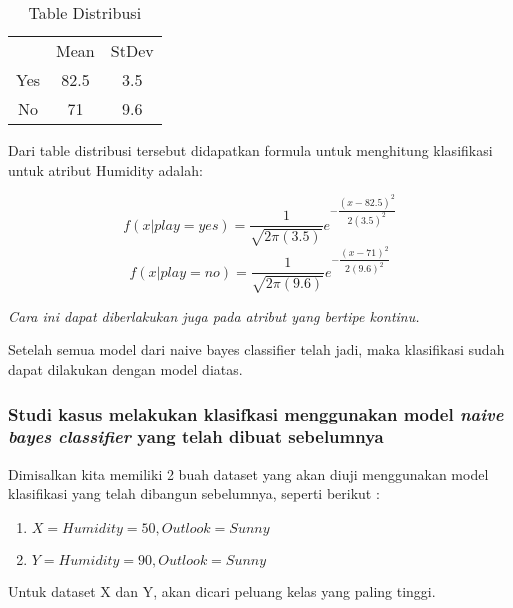 		\begin{table}[ht]
		\centering
		\caption{Table Distribusi}
		\begin{tabular}{|c|c|c|}
		\toprule
		 & Mean & StDev \\
		Yes & 82.5 & 3.5 \\
		No & 71 & 9.6 \\
		\bottomrule
		\end{tabular}
		\end{table}
		
		Dari table distribusi tersebut didapatkan formula untuk menghitung klasifikasi untuk atribut Humidity adalah:
		
		\begin{equation}
			f(x|play=yes) = \dfrac{1}{\sqrt{2\pi(3.5)}}e^{-\dfrac{(x-82.5)^2}{2(3.5)^2}}
		\end{equation}
		\begin{equation}
			f(x|play=no) = \dfrac{1}{\sqrt{2\pi(9.6)}}e^{-\dfrac{(x-71)^2}{2(9.6)^2}} 
		\end{equation}
		
		\textit{Cara ini dapat diberlakukan juga pada atribut yang bertipe kontinu.}
		
		Setelah semua model dari naive bayes classifier telah jadi, maka klasifikasi sudah dapat dilakukan dengan model diatas.

\subsubsection{Studi kasus melakukan klasifkasi menggunakan model \textit{naive bayes classifier} yang telah dibuat sebelumnya}
		Dimisalkan kita memiliki 2 buah dataset yang akan diuji menggunakan model klasifikasi yang telah dibangun sebelumnya, seperti berikut :
		
\begin{enumerate}
	\item $X = {Humidity = 50, Outlook = Sunny}$
	\item $Y = {Humidity = 90, Outlook = Sunny}$
\end{enumerate}
		
Untuk dataset X dan Y, akan dicari peluang kelas yang paling tinggi. \\
		
